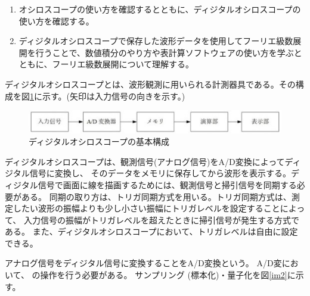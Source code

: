 \begin{enumerate}
  \setlength{\parskip}{0cm} %
  \setlength{\itemsep}{0cm} %
  \item オシロスコープの使い方を確認するとともに、ディジタルオシロスコープの使い方を確認する。
  \item ディジタルオシロスコープで保存した波形データを使用してフーリエ級数展開を行うことで、数値積分のやり方や表計算ソフトウェアの使い方を学ぶとともに、フーリエ級数展開について理解する。
\end{enumerate}

ディジタルオシロスコープとは、波形観測に用いられる計測器具である。その構成を図\ref{im1}に示す。(矢印は入力信号の向きを示す。)

\begin{figure}[htbp]
  \begin{center}
  \includegraphics[width=.5\linewidth]{img/1.jpg}
  \caption{ディジタルオシロスコープの基本構成}
  \label{im1}
  \end{center}
\end{figure}

ディジタルオシロスコープは、観測信号(アナログ信号)をA/D変換によってディジタル信号に変換し、
そのデータをメモリに保存してから波形を表示する。ディジタル信号で画面に線を描画するためには、観測信号と掃引信号を同期する必要がある。
同期の取り方は、トリガ同期方式を用いる。トリガ同期方式は、測定したい波形の振幅よりも少し小さい振幅にトリガレベルを設定することによって、
入力信号の振幅がトリガレベルを超えたときに掃引信号が発生する方式である。
また、ディジタルオシロスコープにおいて、トリガレベルは自由に設定できる。

アナログ信号をディジタル信号に変換することをA/D変換という。 
A/D変において、\textbf{} の操作を行う必要がある。
サンプリング (標本化)・量子化を図\ref{im2}に示す。

